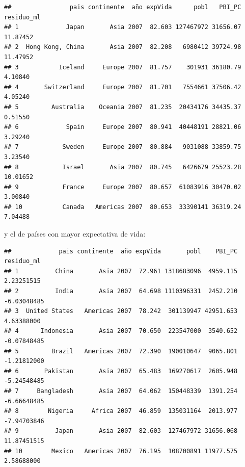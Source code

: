 \documentclass[spanish,]{book}
\newenvironment{Shaded}{\begin{snugshade}}{\end{snugshade}}
\newcommand{\DataTypeTok}[1]{\textcolor[rgb]{0.13,0.29,0.53}{#1}}
\newcommand{\DecValTok}[1]{\textcolor[rgb]{0.00,0.00,0.81}{#1}}
\newcommand{\KeywordTok}[1]{\textcolor[rgb]{0.13,0.29,0.53}{\textbf{#1}}}
\newcommand{\NormalTok}[1]{#1}
\newcommand{\OperatorTok}[1]{\textcolor[rgb]{0.81,0.36,0.00}{\textbf{#1}}}
\newcommand{\StringTok}[1]{\textcolor[rgb]{0.31,0.60,0.02}{#1}}
\begin{document}
\begin{verbatim}
##                pais continente  año expVida      pobl   PBI_PC residuo_ml
## 1             Japan       Asia 2007  82.603 127467972 31656.07   11.87452
## 2  Hong Kong, China       Asia 2007  82.208   6980412 39724.98   11.47952
## 3           Iceland     Europe 2007  81.757    301931 36180.79    4.10840
## 4       Switzerland     Europe 2007  81.701   7554661 37506.42    4.05240
## 5         Australia    Oceania 2007  81.235  20434176 34435.37    0.51550
## 6             Spain     Europe 2007  80.941  40448191 28821.06    3.29240
## 7            Sweden     Europe 2007  80.884   9031088 33859.75    3.23540
## 8            Israel       Asia 2007  80.745   6426679 25523.28   10.01652
## 9            France     Europe 2007  80.657  61083916 30470.02    3.00840
## 10           Canada   Americas 2007  80.653  33390141 36319.24    7.04488
\end{verbatim}

y el de países con mayor expectativa de vida:

\begin{Shaded}
\end{Shaded}

\begin{verbatim}
##             pais continente  año expVida       pobl    PBI_PC  residuo_ml
## 1          China       Asia 2007  72.961 1318683096  4959.115  2.23251515
## 2          India       Asia 2007  64.698 1110396331  2452.210 -6.03048485
## 3  United States   Americas 2007  78.242  301139947 42951.653  4.63388000
## 4      Indonesia       Asia 2007  70.650  223547000  3540.652 -0.07848485
## 5         Brazil   Americas 2007  72.390  190010647  9065.801 -1.21812000
## 6       Pakistan       Asia 2007  65.483  169270617  2605.948 -5.24548485
## 7     Bangladesh       Asia 2007  64.062  150448339  1391.254 -6.66648485
## 8        Nigeria     Africa 2007  46.859  135031164  2013.977 -7.94703846
## 9          Japan       Asia 2007  82.603  127467972 31656.068 11.87451515
## 10        Mexico   Americas 2007  76.195  108700891 11977.575  2.58688000
\end{verbatim}
\end{document}
